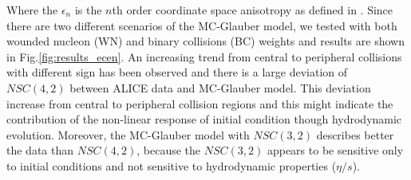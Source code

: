 Where the $\epsilon_n$ is the $n$th order coordinate space anisotropy as defined in \cite{Alver:2010gr}. Since there are two different scenarios of the MC-Glauber model, we tested with both wounded nucleon (WN) and binary collisions (BC) weights and results are shown in Fig.\ref{fig:results_ecen}. An increasing trend from central to peripheral collisions with different sign has been observed and there is a large deviation of $NSC(4,2)$ between ALICE data and MC-Glauber model. This deviation increase from central to peripheral collision regions and this might indicate the contribution of the non-linear response of initial condition though hydrodynamic evolution. Moreover, the MC-Glauber model with  $NSC(3,2)$ describes better the data  than $NSC(4,2)$,  because the  $NSC(3,2)$ appears to be sensitive only to initial conditions and not sensitive to hydrodynamic properties ($\eta/s$). 


